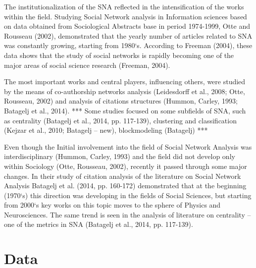 \documentclass[11pt]{article} %
\newcommand{\Remark}[1]{\ifodd\value{page} \normalmarginpar
 \else \reversemarginpar \fi \marginpar{{\footnotesize #1}} }
\begin{document}
The institutionalization of the SNA reflected in the intensification of the works within the field. Studying Social Network analysis in Information sciences based on data obtained from Sociological Abstracts base in period 1974-1999, Otte and Rousseau (2002), demonstrated that the yearly number of articles related to SNA was constantly growing, starting from 1980`s. According to Freeman (2004), these data shows that the study of social networks is rapidly becoming one of the major areas of social science research (Freeman, 2004).  \medskip 

The most important works and central players, influencing others, were studied by the means of co-authorship networks analysis (Leidesdorff et al., 2008; Otte, Rousseau, 2002) and analysis of citations structures (Hummon, Carley, 1993; Batagelj et al., 2014). *** \Remark{What was found}  Some studies focused on some subfields of SNA, such as centrality (Batagelj et al., 2014, pp. 117-139), clustering and classification (Kejzar et al., 2010; Batagelj – new), blockmodeling (Batagelj) ***  \Remark{What was found} \medskip 

Even though the Initial involvement into the field of Social Network Analysis was interdisciplinary (Hummon, Carley, 1993) and the field did not develop only within Sociology (Otte, Rousseau, 2002), recently it passed through some major changes. In their study of citation analysis of the literature on Social Network Analysis Batagelj et al. (2014, pp. 160-172) demonstrated that at the beginning (1970`s) this direction was developing in the fields of Social Sciences, but starting from 2000`s key works on this topic moves to the sphere of Physics and Neurosciences. The same trend is seen in the analysis of literature on centrality -- one of the metrics in SNA (Batagelj et al., 2014, pp. 117-139). \medskip  
 


\section{Data}
\end{document}
